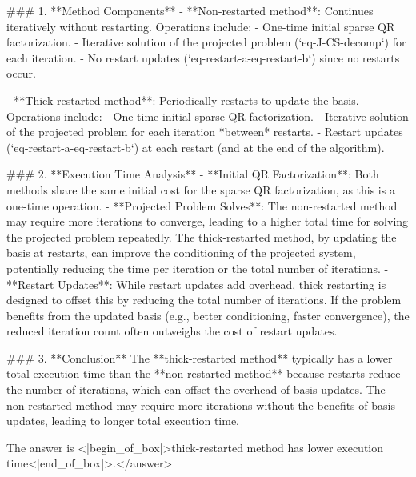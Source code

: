 ### 1. **Method Components**  
- **Non-restarted method**: Continues iteratively without restarting. Operations include:  
  - One-time initial sparse QR factorization.  
  - Iterative solution of the projected problem (`eq-J-CS-decomp`) for each iteration.  
  - No restart updates (`eq-restart-a-eq-restart-b`) since no restarts occur.  

- **Thick-restarted method**: Periodically restarts to update the basis. Operations include:  
  - One-time initial sparse QR factorization.  
  - Iterative solution of the projected problem for each iteration *between* restarts.  
  - Restart updates (`eq-restart-a-eq-restart-b`) at each restart (and at the end of the algorithm).  


### 2. **Execution Time Analysis**  
- **Initial QR Factorization**: Both methods share the same initial cost for the sparse QR factorization, as this is a one-time operation.  
- **Projected Problem Solves**: The non-restarted method may require more iterations to converge, leading to a higher total time for solving the projected problem repeatedly. The thick-restarted method, by updating the basis at restarts, can improve the conditioning of the projected system, potentially reducing the time per iteration or the total number of iterations.  
- **Restart Updates**: While restart updates add overhead, thick restarting is designed to offset this by reducing the total number of iterations. If the problem benefits from the updated basis (e.g., better conditioning, faster convergence), the reduced iteration count often outweighs the cost of restart updates.  


### 3. **Conclusion**  
The **thick-restarted method** typically has a lower total execution time than the **non-restarted method** because restarts reduce the number of iterations, which can offset the overhead of basis updates. The non-restarted method may require more iterations without the benefits of basis updates, leading to longer total execution time.  

The answer is <|begin_of_box|>thick-restarted method has lower execution time<|end_of_box|>.</answer>